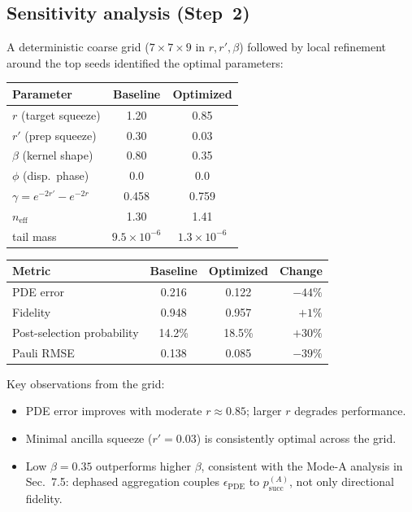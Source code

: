 \documentclass[11pt]{article}
\begin{document}
\subsection{Sensitivity analysis (Step~2)}

A deterministic coarse grid ($7\times 7\times 9$ in $r,r',\beta$) followed by
local refinement around the top seeds identified the optimal parameters:
\begin{center}
\begin{tabular}{lcc}
\toprule
Parameter & Baseline & Optimized \\
\midrule
$r$ (target squeeze)    & 1.20 & 0.85 \\
$r'$ (prep squeeze)     & 0.30 & 0.03 \\
$\beta$ (kernel shape)  & 0.80 & 0.35 \\
$\phi$ (disp.\ phase)   & 0.0  & 0.0  \\
\midrule
$\gamma = e^{-2r'}-e^{-2r}$ & 0.458 & 0.759 \\
$n_{\mathrm{eff}}$           & 1.30  & 1.41  \\
tail mass                    & $9.5\times 10^{-6}$ & $1.3\times 10^{-6}$ \\
\bottomrule
\end{tabular}
\end{center}

\begin{center}
\begin{tabular}{lccr}
\toprule
Metric & Baseline & Optimized & Change \\
\midrule
PDE error        & 0.216 & 0.122 & $-44\%$ \\
Fidelity         & 0.948 & 0.957 & $+1\%$  \\
Post-selection probability & 14.2\% & 18.5\% & $+30\%$ \\
Pauli RMSE       & 0.138 & 0.085 & $-39\%$ \\
\bottomrule
\end{tabular}
\end{center}

Key observations from the grid:
\begin{itemize}[itemsep=2pt,topsep=2pt]
\item PDE error improves with moderate $r\approx 0.85$; larger $r$ degrades performance.
\item Minimal ancilla squeeze ($r'=0.03$) is consistently optimal across the grid.
\item Low $\beta=0.35$ outperforms higher $\beta$, consistent with the Mode-A analysis
      in Sec.~7.5: dephased aggregation couples $\epsilon_{\mathrm{PDE}}$ to
      $p_{\mathrm{succ}}^{(A)}$, not only directional fidelity.
\end{itemize}
\end{document}
